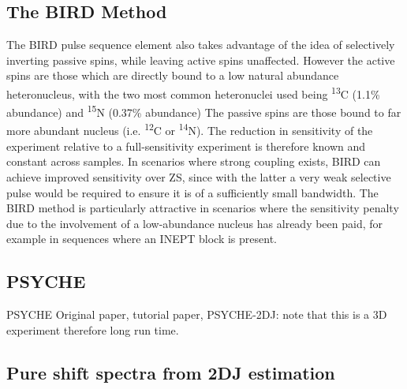 \subsection{The \acs{BIRD} Method}
The \ac{BIRD} pulse sequence element\cite{Garbow1982,Bax1983} also takes
advantage of the idea of selectively inverting passive spins, while leaving
active spins unaffected.
However the active spins are those which are directly bound to a low natural
abundance
heteronucleus, with the two most common heteronuclei used being \textsuperscript{13}C (1.1\% abundance) and \textsuperscript{15}N (0.37\% abundance)
The passive spins are those bound to far more abundant nucleus (i.e.
\textsuperscript{12}C or \textsuperscript{14}N). The reduction in sensitivity
of the experiment relative to a full-sensitivity experiment is therefore known
and constant across samples. In scenarios where strong coupling exists, \ac{BIRD} can
achieve improved sensitivity over \ac{ZS}, since with the latter a very weak
selective pulse would be required to ensure it is of a sufficiently small
bandwidth. The \ac{BIRD} method is particularly attractive in scenarios where
the sensitivity penalty due to the involvement of a low-abundance nucleus has
already been paid, for example in sequences where an \ac{INEPT} block is present.

\subsection{\acs{PSYCHE}}
\label{subsec:psyche}
\ac{PSYCHE}
Original paper\cite{Foroozandeh2014}, tutorial paper\cite{Foroozandeh2018},
PSYCHE-2DJ\cite{Foroozandeh2015,Kiraly2017}: note that this is a 3D experiment therefore long
run time.

\subsection{Pure shift spectra from 2DJ estimation}

